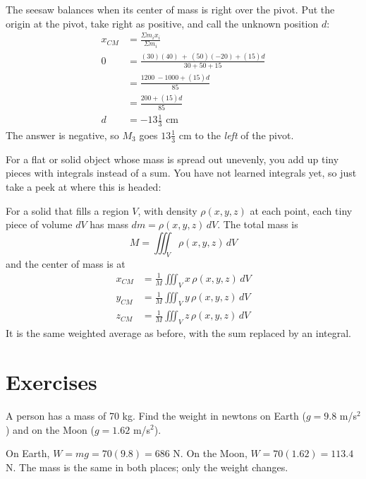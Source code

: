 \begin{Answer}[ref=center_of_mass1]
  The seesaw balances when its center of mass is right over the pivot. Put the origin at the pivot, take right as positive, and call the unknown position $d$:
  \begin{align*}
    x_{CM} & = \frac{\Sigma m_i x_i}{\Sigma m_i}                                                                    \\
    0      & = \frac{\left(30\right)\left(40\right)\ +\ \left(50\right)\left(-20\right)+\left(15\right)d}{30+50+15} \\
           & = \frac{1200\ -1000 +\left(15\right)d}{85}                                                             \\
           & = \frac{200 +\left(15\right)d}{85}                                                                     \\
    d      & = -13\tfrac{1}{3} \text{ cm}
  \end{align*}
  The answer is negative, so $M_3$ goes $13\tfrac{1}{3}$ cm to the \emph{left} of the pivot.
\end{Answer}

For a flat or solid object whose mass is spread out unevenly, you add up tiny pieces with integrals instead of a sum. You have not learned integrals yet, so just take a peek at where this is headed:
\begin{mdframed}[style=important, frametitle={3D Center of Mass}]
  For a solid that fills a region $V$, with density $\rho(x,y,z)$ at each point, each tiny piece of volume $dV$ has mass $dm = \rho(x,y,z)\,dV$. The total mass is
  $$M=\iiint_{V} \rho(x,y,z)\,dV$$
  and the center of mass is at
  \begin{align*}
    x_{CM} & =\frac{1}{M}\iiint_V x\,\rho(x,y,z)\,dV \\
    y_{CM} & =\frac{1}{M}\iiint_V y\,\rho(x,y,z)\,dV \\
    z_{CM} & =\frac{1}{M}\iiint_V z\,\rho(x,y,z)\,dV
  \end{align*}
  It is the same weighted average as before, with the sum replaced by an integral.
\end{mdframed}

\section{Exercises}

\begin{Exercise}[label=mw1, title={Weight on Earth and the Moon}]
A person has a mass of 70 kg. Find the weight in newtons on Earth ($g = 9.8$ m/s$^2$) and on the Moon ($g = 1.62$ m/s$^2$).
\end{Exercise}
\begin{Answer}[ref=mw1]
On Earth, $W = mg = 70(9.8) = 686$ N. On the Moon, $W = 70(1.62) = 113.4$ N. The mass is the same in both places; only the weight changes.
\end{Answer}

